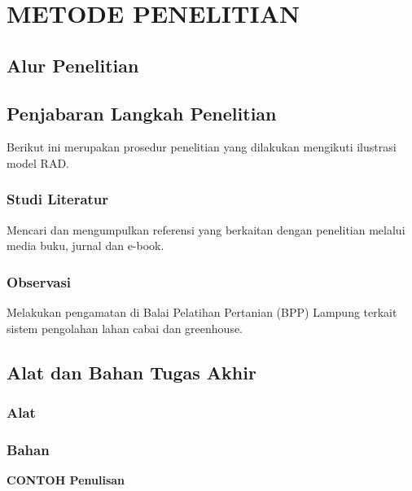 \chapter{METODE PENELITIAN}

%
\vspace{4.5pt}

\begin{flushleft}
   \begin{justify}
      \section{Alur Penelitian}

   \section{Penjabaran Langkah Penelitian}
    Berikut ini merupakan prosedur penelitian yang dilakukan mengikuti ilustrasi model RAD.
   \subsection{Studi Literatur}
 Mencari dan mengumpulkan referensi yang berkaitan dengan penelitian melalui media buku, jurnal dan e-book.
      
\subsection{Observasi}
Melakukan pengamatan di Balai Pelatihan Pertanian (BPP) Lampung terkait sistem pengolahan lahan cabai dan greenhouse.
   \section{Alat dan Bahan Tugas Akhir}
   \subsection{Alat}
   \subsection{Bahan}
   \end{justify}
   
\end{flushleft}

\vspace{5cm}
\noindent \textbf{CONTOH Penulisan}
